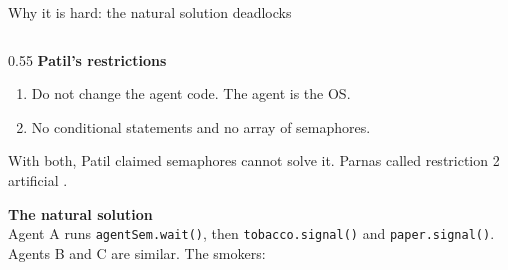 \documentclass[aspectratio=169,10pt,xcolor=table]{beamer}
\newcommand{\code}[1]{\texttt{#1}}
\begin{document}
\begin{frame}[fragile]{Why it is hard: the natural solution deadlocks}
    \begin{columns}[T]
        \begin{column}{0.55\textwidth}
            \small
            \textbf{Patil's restrictions} \cite{downey}
            \begin{enumerate}
                \setlength\itemsep{1pt}
                \item Do not change the agent code. The agent is the OS.
                \item No conditional statements and no array of semaphores.
            \end{enumerate}
            \footnotesize With both, Patil claimed semaphores cannot solve it.
            Parnas called restriction 2 artificial \cite{parnas,downey}.

            \vspace{5pt}
            \small\textbf{The natural solution} \cite{downey}\\
            \footnotesize Agent A runs \code{agentSem.wait()}, then
            \code{tobacco.signal()} and \code{paper.signal()}. Agents B and C
            are similar. The smokers:
            \vspace{2pt}


\end{column}
\end{columns}
\end{frame}
\end{document}
